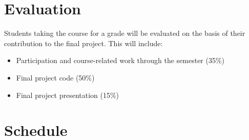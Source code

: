 \documentclass[10pt,a4paper]{amsart}
\begin{document}
\section{Evaluation}

Students taking the course for a grade will be evaluated on the basis of their contribution to the final project. This will include:

\begin{itemize}
 \item Participation and course-related work through the semester (35\%)
 \item Final project code (50\%)
 \item Final project presentation (15\%)
\end{itemize}

\section{Schedule}
\end{document}
